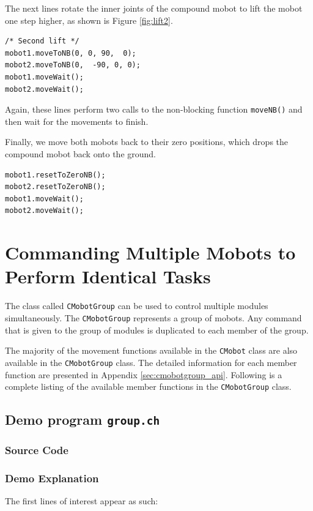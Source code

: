 \documentclass{article}
\begin{document}
The next lines rotate the inner joints of the compound mobot to lift the mobot
one step higher, as shown is Figure \ref{fig:lift2}.
\begin{verbatim}
/* Second lift */
mobot1.moveToNB(0, 0, 90,  0);
mobot2.moveToNB(0,  -90, 0, 0);
mobot1.moveWait();
mobot2.moveWait();
\end{verbatim}
Again, these lines perform two calls to the non-blocking function
\texttt{moveNB()} and then wait for the movements to finish.

Finally, we move both mobots back to their zero positions, which drops 
the compound mobot back onto the ground.
\begin{verbatim}
mobot1.resetToZeroNB();
mobot2.resetToZeroNB();
mobot1.moveWait();
mobot2.moveWait();
\end{verbatim}

\section{Commanding Multiple Mobots to Perform Identical Tasks}
The class called \texttt{CMobotGroup} can be used
to control multiple modules simultaneously. The \texttt{CMobotGroup} represents
a group of mobots. Any command that is given to the group of modules is 
duplicated to each member of the group.

The majority of the movement functions available in the \texttt{CMobot} class
are also available in the \texttt{CMobotGroup} class. 
The detailed information for each member function are presented in 
Appendix \ref{sec:cmobotgroup_api}.
 Following
is a complete listing of the available member functions in the \texttt{CMobotGroup}
class.

\vspace{8pt}
\noindent


\noindent


\subsection{Demo program \texttt{group.ch}}
\subsubsection{Source Code}


\subsubsection{Demo Explanation}
The first lines of interest appear as such:
\end{document}

